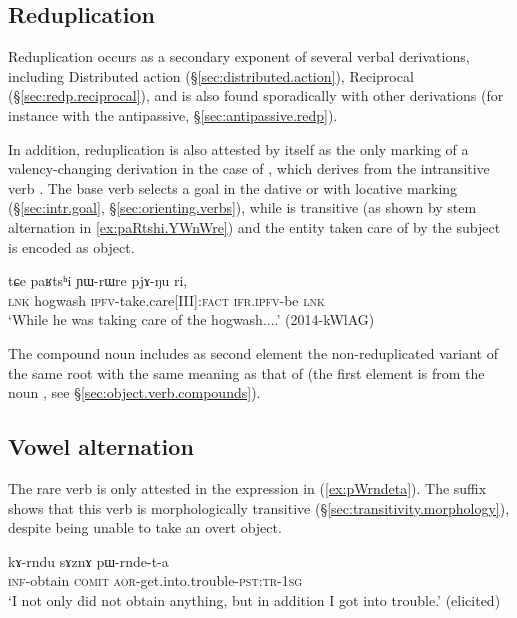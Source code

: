 \subsection{Reduplication} \label{sec:redp.voice}
Reduplication occurs as a secondary exponent of several verbal derivations, including  Distributed action (§\ref{sec:distributed.action}), Reciprocal (§\ref{sec:redp.reciprocal}), and is also found sporadically with other derivations (for instance with the antipassive, §\ref{sec:antipassive.redp}).  
 
In addition, reduplication is also attested by itself as the only marking of a valency-changing derivation in the case of , which derives from the intransitive verb . The base verb   selects a goal in the dative or with locative marking (§\ref{sec:intr.goal}, §\ref{sec:orienting.verbs}), while  is transitive (as shown by stem alternation in \ref{ex:paRtshi.YWnWre}) and the entity taken care of by the subject is encoded as object. 

\begin{exe}
\ex \label{ex:paRtshi.YWnWre}
\gll tɕe paʁtsʰi ɲɯ-rɯre pjɤ-ŋu ri, \\
\textsc{lnk} hogwash \textsc{ipfv}-take.care[III]:\textsc{fact} \textsc{ifr}.\textsc{ipfv}-be \textsc{lnk} \\
\glt `While he was taking care of the hogwash....' (2014-kWlAG)
\end{exe}

The compound noun  includes as second element the non-redupli\-ca\-ted variant of the same root  with the same meaning as that of  (the first element is from the noun , see §\ref{sec:object.verb.compounds}).

\subsection{Vowel alternation} \label{sec:pWrndeta}
The rare verb  is only attested in the expression in (\ref{ex:pWrndeta}). The  suffix shows that this verb is morphologically transitive (§\ref{sec:transitivity.morphology}), despite being unable to take an overt object. 

\begin{exe}
\ex \label{ex:pWrndeta}
\gll kɤ-rndu sɤznɤ pɯ-rnde-t-a  \\
\textsc{inf}-obtain \textsc{comit} \textsc{aor}-get.into.trouble-\textsc{pst}:\textsc{tr}-\textsc{1sg} \\
\glt `I not only did not obtain anything, but in addition I got into trouble.' (elicited)
\end{exe}

